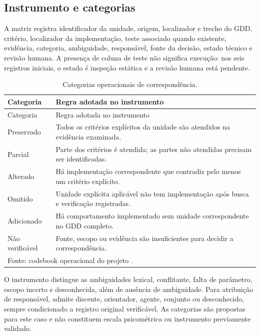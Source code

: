 \subsection{Instrumento e categorias}
A matriz registra identificador da unidade, origem, localizador e trecho do GDD, critério, localizador da implementação, teste associado quando existente, evidência, categoria, ambiguidade, responsável, fonte da decisão, estado técnico e revisão humana. A presença de coluna de teste não significa execução: nos seis registros iniciais, o estado é inspeção estática e a revisão humana está pendente.

\begin{singlespace}
\begin{longtable}{p{}p{}}
\caption{Categorias operacionais de correspondência.}\label{tab:categories}\\
\toprule Categoria & Regra adotada no instrumento \\\midrule\endfirsthead
\toprule Categoria & Regra adotada no instrumento \\\midrule\endhead
Preservado & Todos os critérios explícitos da unidade são atendidos na evidência examinada.\\
Parcial & Parte dos critérios é atendida; as partes não atendidas precisam ser identificadas.\\
Alterado & Há implementação correspondente que contradiz pelo menos um critério explícito.\\
Omitido & Unidade explícita aplicável não tem implementação após busca e verificação registradas.\\
Adicionado & Há comportamento implementado sem unidade correspondente no GDD completo.\\
Não verificável & Fonte, escopo ou evidência são insuficientes para decidir a correspondência.\\
\bottomrule
\multicolumn{2}{l}{\footnotesize Fonte: codebook operacional do projeto .}\\
\end{longtable}
\end{singlespace}

O instrumento distingue as ambiguidades lexical, conflitante, falta de parâmetro, escopo incerto e desconhecida, além de ausência de ambiguidade. Para atribuição de responsável, admite discente, orientador, agente, conjunto ou desconhecido, sempre condicionado a registro original verificável. As categorias são propostas para este caso e não constituem escala psicométrica ou instrumento previamente validado.


